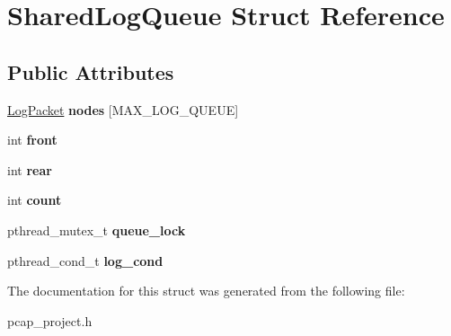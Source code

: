 \hypertarget{structSharedLogQueue}{}\section{Shared\+Log\+Queue Struct Reference}
\label{structSharedLogQueue}
\subsection*{Public Attributes}
\begin{DoxyCompactItemize}
\item 
\mbox{\label{structSharedLogQueue_ae95b68a3126058b7d31e5d5b197306da}} 
\mbox{\hyperlink{structLogPacket}{Log\+Packet}} {\bfseries nodes} \mbox{[}M\+A\+X\+\_\+\+L\+O\+G\+\_\+\+Q\+U\+E\+UE\mbox{]}
\item 
\mbox{\label{structSharedLogQueue_a2608a79a93f3591ec0b6dafccf8e28d0}} 
int {\bfseries front}
\item 
\mbox{\label{structSharedLogQueue_a4fcd50beef88db7997884a1c7b21c465}} 
int {\bfseries rear}
\item 
\mbox{\label{structSharedLogQueue_aca1729ea98b4507940c8c606b3ed7ccd}} 
int {\bfseries count}
\item 
\mbox{\label{structSharedLogQueue_a2116713448f916308ac5d93c193941dc}} 
pthread\+\_\+mutex\+\_\+t {\bfseries queue\+\_\+lock}
\item 
\mbox{\label{structSharedLogQueue_ab131a1a337c343826514d7639fc388da}} 
pthread\+\_\+cond\+\_\+t {\bfseries log\+\_\+cond}
\end{DoxyCompactItemize}


The documentation for this struct was generated from the following file\+:\begin{DoxyCompactItemize}
\item 
pcap\+\_\+project.\+h\end{DoxyCompactItemize}
